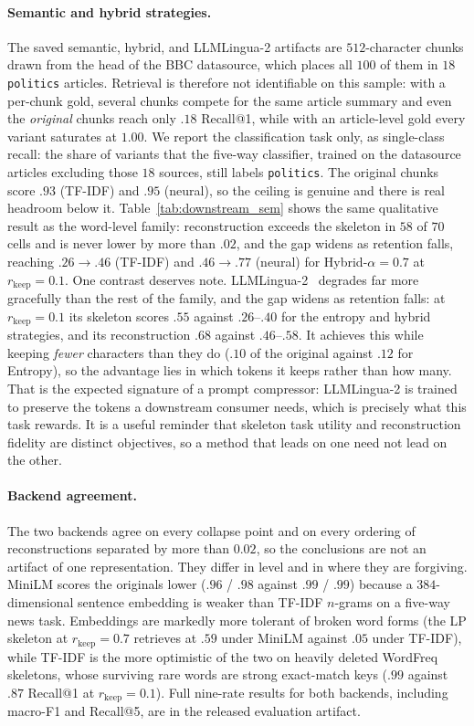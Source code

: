 \documentclass[11pt]{article}
\newcommand{\rkeep}{r_{\mathrm{keep}}}
\begin{document}
\paragraph{Semantic and hybrid strategies.}
The saved semantic, hybrid, and LLMLingua-2 artifacts are $512$-character chunks drawn from the head of the
BBC datasource, which places all $100$ of them in $18$ \texttt{politics} articles. Retrieval is therefore not
identifiable on this sample: with a per-chunk gold, several chunks compete for the same article summary and
even the \emph{original} chunks reach only $.18$ Recall@1, while with an article-level gold every variant
saturates at $1.00$. We report the classification task only, as single-class recall: the share of variants
that the five-way classifier, trained on the datasource articles excluding those $18$ sources, still labels \texttt{politics}. The original chunks score $.93$ (TF-IDF) and $.95$ (neural), so the ceiling is
genuine and there is real headroom below it. Table~\ref{tab:downstream_sem} shows the same qualitative
result as the word-level family: reconstruction exceeds the skeleton in $58$ of $70$ cells and is never lower by more than $.02$,
and the gap widens as retention falls, reaching $.26 \to .46$ (TF-IDF) and
$.46 \to .77$ (neural) for Hybrid-$\alpha{=}0.7$ at $\rkeep = 0.1$. One contrast deserves note.
LLMLingua-2~\citep{pan2024llmlingua} degrades far more gracefully than the rest of the family, and the gap
widens as retention falls: at $\rkeep = 0.1$ its skeleton scores $.55$ against $.26$--$.40$ for the entropy
and hybrid strategies, and its reconstruction $.68$ against $.46$--$.58$. It achieves this while keeping
\emph{fewer} characters than they do ($.10$ of the original against $.12$ for Entropy), so the advantage
lies in which tokens it keeps rather than how many. That is the expected signature of a prompt compressor:
LLMLingua-2 is trained to preserve the tokens a downstream consumer needs, which is precisely what this
task rewards. It is a useful reminder that skeleton task utility and reconstruction fidelity are distinct
objectives, so a method that leads on one need not lead on the other.

\paragraph{Backend agreement.}
The two backends agree on every collapse point and on every ordering of reconstructions separated by more
than $0.02$, so the conclusions are not an artifact of one representation. They differ in level and in where they are forgiving. MiniLM scores
the originals lower ($.96$ / $.98$ against $.99$ / $.99$) because a $384$-dimensional sentence embedding is
weaker than TF-IDF $n$-grams on a five-way news task. Embeddings are markedly more tolerant of broken word forms (the LP skeleton at $\rkeep = 0.7$ retrieves at $.59$ under MiniLM against $.05$ under TF-IDF), while TF-IDF is the more optimistic of the two on heavily deleted WordFreq skeletons, whose surviving rare
words are strong exact-match keys ($.99$ against $.87$ Recall@1 at $\rkeep = 0.1$). Full nine-rate results
for both backends, including macro-F1 and Recall@5, are in the released evaluation artifact.
\end{document}
